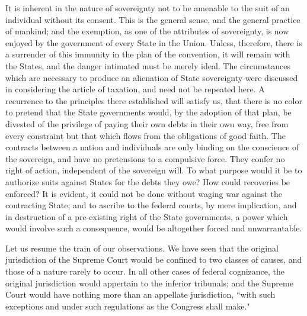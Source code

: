 It is inherent in the nature of sovereignty not to be amenable to the suit of an individual without its consent. 
This is the general sense, and the general practice of mankind; and the exemption, as one of the attributes of sovereignty, is now enjoyed by the government of every State in the Union. 
Unless, therefore, there is a surrender of this immunity in the plan of the convention, it will remain with the States, and the danger intimated must be merely ideal. 
The circumstances which are necessary to produce an alienation of State sovereignty were discussed in considering the article of taxation, and need not be repeated here. 
A recurrence to the principles there established will satisfy us, that there is no color to pretend that the State governments would, by the adoption of that plan, be divested of the privilege of paying their own debts in their own way, free from every constraint but that which flows from the obligations of good faith. 
The contracts between a nation and individuals are only binding on the conscience of the sovereign, and have no pretensions to a compulsive force. 
They confer no right of action, independent of the sovereign will. 
To what purpose would it be to authorize suits against States for the debts they owe? 
How could recoveries be enforced? 
It is evident, it could not be done without waging war against the contracting State; and to ascribe to the federal courts, by mere implication, and in destruction of a pre-existing right of the State governments, a power which would involve such a consequence, would be altogether forced and unwarrantable.

Let us resume the train of our observations. 
We have seen that the original jurisdiction of the Supreme Court would be confined to two classes of causes, and those of a nature rarely to occur. 
In all other cases of federal cognizance, the original jurisdiction would appertain to the inferior tribunals; and the Supreme Court would have nothing more than an appellate jurisdiction, ``with such exceptions and under such regulations as the Congress shall make."

